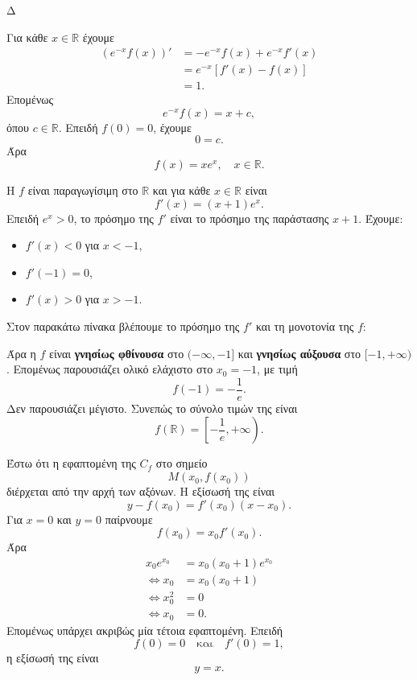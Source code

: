 \begin{thema}{Δ}
\begin{erwthma}
\item Για κάθε $x\in\mathbb{R}$ έχουμε
\begin{align*}
\left(e^{-x}f(x)\right)'
&=-e^{-x}f(x)+e^{-x}f'(x)\\
&=e^{-x}\left[f'(x)-f(x)\right]\\
&=1.
\end{align*}
Επομένως
\[
e^{-x}f(x)=x+c,
\]
όπου $c\in\mathbb{R}$. Επειδή $f(0)=0$, έχουμε
\[
0=c.
\]
Άρα
\[
{f(x)=xe^x},\quad x\in\mathbb{R}.
\]

\item Η $f$ είναι παραγωγίσιμη στο $\mathbb{R}$ και για κάθε $x\in\mathbb{R}$ είναι
\[
f'(x)=(x+1)e^x.
\]
Επειδή $e^x>0$, το πρόσημο της $f'$ είναι το πρόσημο της παράστασης $x+1$. Έχουμε:
\begin{itemize}
\item $f'(x)<0$ για $x<-1$,
\item $f'(-1)=0$,
\item $f'(x)>0$ για $x>-1$.
\end{itemize}
Στον παρακάτω πίνακα βλέπουμε το πρόσημο της $f'$ και τη μονοτονία της $f$:
\begin{center}
\end{center}

Άρα η $f$ είναι \textbf{γνησίως φθίνουσα} στο $(-\infty,-1]$ και \textbf{γνησίως αύξουσα} στο $[-1,+\infty)$. Επομένως παρουσιάζει ολικό ελάχιστο στο $x_0=-1$, με τιμή
\[
{f(-1)=-\frac{1}{e}}.
\]
Δεν παρουσιάζει μέγιστο. Συνεπώς το σύνολο τιμών της είναι
\[
{f(\mathbb{R})=
\left[-\frac{1}{e},+\infty\right)}.
\]

\item Έστω ότι η εφαπτομένη της $C_f$ στο σημείο
\[
M\left(x_0,f(x_0)\right)
\]
διέρχεται από την αρχή των αξόνων. Η εξίσωσή της είναι
\[
y-f(x_0)=f'(x_0)(x-x_0).
\]
Για $x=0$ και $y=0$ παίρνουμε
\[
f(x_0)=x_0f'(x_0).
\]
Άρα
\begin{align*}
x_0e^{x_0}
&=x_0(x_0+1)e^{x_0}\\
\Leftrightarrow
x_0&=x_0(x_0+1)\\
\Leftrightarrow
x_0^2&=0\\
\Leftrightarrow
x_0&=0.
\end{align*}
Επομένως υπάρχει ακριβώς μία τέτοια εφαπτομένη. Επειδή
\[
f(0)=0
\quad\text{και}\quad
f'(0)=1,
\]
η εξίσωσή της είναι
\[
{y=x}.
\]


\end{erwthma}
\end{thema}
